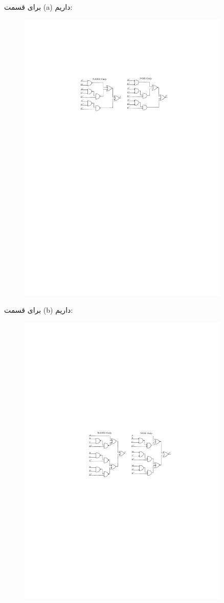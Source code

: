 برای قسمت (a) داریم:

\begin{figure}[h]
	\centering
	\includegraphics[width=0.9\textwidth]{fig/Q7_a.pdf}
	\label{img7_a}
\end{figure}


برای قسمت (b) داریم:


\begin{figure}[h]
	\centering
	\includegraphics[width=0.9\textwidth]{fig/Q7_b.pdf}
	\label{img7_b}
\end{figure}